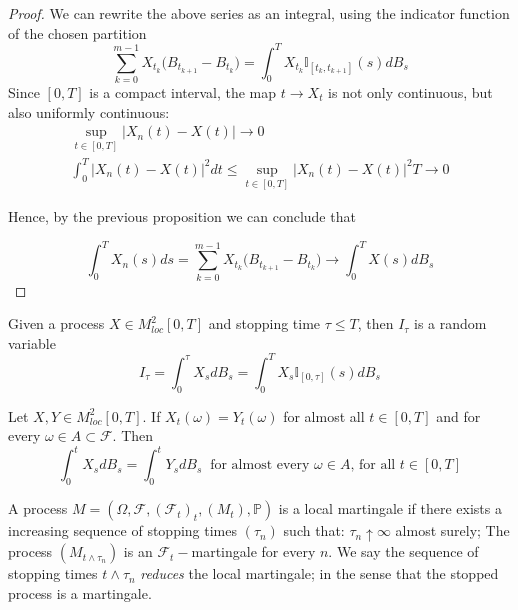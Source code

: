 \begin{proof}
    We can rewrite the above series as an integral, using the indicator function of the chosen partition
    \begin{equation*}
        \sum_{k=0}^{m-1} X_{t_k}\big( B_{t_{k+1}}-B_{t_k} \big) = \int_0^T X_{t_k} \mathbb{I}_{[t_k, t_{k+1}]}(s) dB_s
    \end{equation*}
    Since $[0,T]$ is a compact interval, the map $t \to X_t$ is not only continuous, but also uniformly continuous:
    \begin{gather*}
        \sup_{t \in [0,T]} \big\vert X_n(t) - X(t) \big\vert \to 0 \\
        \int_0^T \big\vert X_n(t) - X(t) \big\vert^2 dt \leq \sup_{t \in [0,T]} \big\vert X_n(t) - X(t) \big\vert^2 T \to 0
    \end{gather*}

    Hence, by the previous proposition we can conclude that

    \begin{equation*}
        \int_0^T X_n(s) ds = \sum_{k=0}^{m-1} X_{t_k} \big(B_{t_{k+1}}-B_{t_k} \big) \to \int_0^T X(s) dB_s
    \end{equation*}
\end{proof}

\begin{proposition}
    Given a process $X \in M^2_{loc}[0,T]$ and stopping time $\tau \leq T$, then $I_{\tau}$ is a random variable
    \begin{equation*}
        I_{\tau} = \int_0^{\tau} X_s dB_s = \int_0^T X_s \mathbb{I}_{[0,\tau]}(s) dB_s
    \end{equation*}
\end{proposition}

\begin{proposition}
    Let $X,Y \in M^2_{loc}[0,T]$. If $X_{t}(\omega) = Y_t(\omega)$ for almost all $t \in [0,T]$ and for every $\omega \in A \subset \mathcal{F}$. Then
    \begin{equation*}
        \int_0^t X_s dB_s = \int_0^t Y_s dB_s \;\; \text{for almost every $\omega \in A$, for all $t \in [0,T]$}
    \end{equation*}
\end{proposition}

A process $M = (\Omega, \mathcal{F}, (\mathcal{F}_t)_t, (M_t), \mathbb{P})$ is a local martingale if there exists a increasing sequence of stopping times $(\tau_n)$ such that: $\tau_n \uparrow \infty$ almost surely; The process $(M_{t \wedge \tau_n})$ is an $\mathcal{F}_t-$martingale for every $n$. We say the sequence of stopping times $t \wedge \tau_n$ \textit{reduces} the local martingale; in the sense that the stopped process is a martingale. 

